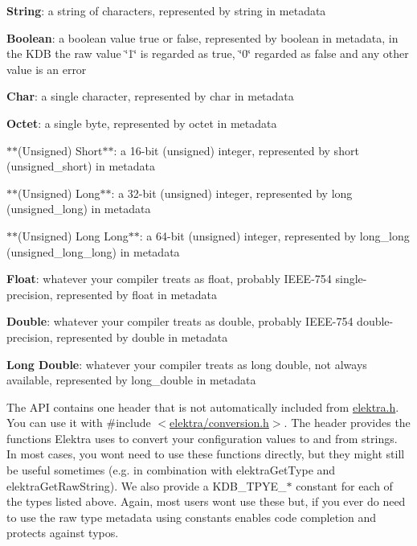 \begin{DoxyItemize}
\item {\bfseries String}\+: a string of characters, represented by {\ttfamily string} in metadata
\item {\bfseries Boolean}\+: a boolean value {\ttfamily true} or {\ttfamily false}, represented by {\ttfamily boolean} in metadata, in the K\+DB the raw value {\ttfamily \char`\"{}1\char`\"{}} is regarded as true, {\ttfamily \char`\"{}0\char`\"{}} regarded as false and any other value is an error
\item {\bfseries Char}\+: a single character, represented by {\ttfamily char} in metadata
\item {\bfseries Octet}\+: a single byte, represented by {\ttfamily octet} in metadata
\item $\ast$$\ast$(Unsigned) Short$\ast$$\ast$\+: a 16-\/bit (unsigned) integer, represented by {\ttfamily short} ({\ttfamily unsigned\+\_\+short}) in metadata
\item $\ast$$\ast$(Unsigned) Long$\ast$$\ast$\+: a 32-\/bit (unsigned) integer, represented by {\ttfamily long} ({\ttfamily unsigned\+\_\+long}) in metadata
\item $\ast$$\ast$(Unsigned) Long Long$\ast$$\ast$\+: a 64-\/bit (unsigned) integer, represented by {\ttfamily long\+\_\+long} ({\ttfamily unsigned\+\_\+long\+\_\+long}) in metadata
\item {\bfseries Float}\+: whatever your compiler treats as {\ttfamily float}, probably I\+E\+E\+E-\/754 single-\/precision, represented by {\ttfamily float} in metadata
\item {\bfseries Double}\+: whatever your compiler treats as {\ttfamily double}, probably I\+E\+E\+E-\/754 double-\/precision, represented by {\ttfamily double} in metadata
\item {\bfseries Long Double}\+: whatever your compiler treats as {\ttfamily long double}, not always available, represented by {\ttfamily long\+\_\+double} in metadata
\end{DoxyItemize}

The A\+PI contains one header that is not automatically included from {\ttfamily \hyperlink{elektra_8h}{elektra.\+h}}. You can use it with {\ttfamily \#include $<$\hyperlink{conversion_8h}{elektra/conversion.\+h}$>$}. The header provides the functions Elektra uses to convert your configuration values to and from strings. In most cases, you won\textquotesingle{}t need to use these functions directly, but they might still be useful sometimes (e.\+g. in combination with {\ttfamily elektra\+Get\+Type} and {\ttfamily elektra\+Get\+Raw\+String}). We also provide a {\ttfamily K\+D\+B\+\_\+\+T\+P\+Y\+E\+\_\+$\ast$} constant for each of the types listed above. Again, most users won\textquotesingle{}t use these but, if you ever do need to use the raw type metadata using constants enables code completion and protects against typos.

